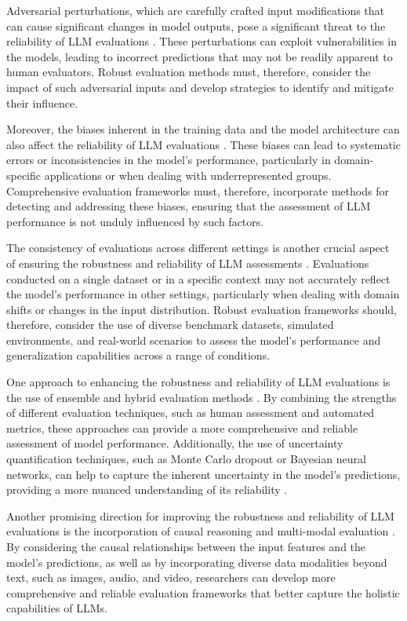 \documentclass[11pt]{article}
\begin{document}
Adversarial perturbations, which are carefully crafted input modifications that can cause significant changes in model outputs, pose a significant threat to the reliability of LLM evaluations \cite{ref135}. These perturbations can exploit vulnerabilities in the models, leading to incorrect predictions that may not be readily apparent to human evaluators. Robust evaluation methods must, therefore, consider the impact of such adversarial inputs and develop strategies to identify and mitigate their influence.

Moreover, the biases inherent in the training data and the model architecture can also affect the reliability of LLM evaluations \cite{ref136}. These biases can lead to systematic errors or inconsistencies in the model's performance, particularly in domain-specific applications or when dealing with underrepresented groups. Comprehensive evaluation frameworks must, therefore, incorporate methods for detecting and addressing these biases, ensuring that the assessment of LLM performance is not unduly influenced by such factors.

The consistency of evaluations across different settings is another crucial aspect of ensuring the robustness and reliability of LLM assessments \cite{ref137}. Evaluations conducted on a single dataset or in a specific context may not accurately reflect the model's performance in other settings, particularly when dealing with domain shifts or changes in the input distribution. Robust evaluation frameworks should, therefore, consider the use of diverse benchmark datasets, simulated environments, and real-world scenarios to assess the model's performance and generalization capabilities across a range of conditions.

One approach to enhancing the robustness and reliability of LLM evaluations is the use of ensemble and hybrid evaluation methods \cite{ref138}. By combining the strengths of different evaluation techniques, such as human assessment and automated metrics, these approaches can provide a more comprehensive and reliable assessment of model performance. Additionally, the use of uncertainty quantification techniques, such as Monte Carlo dropout or Bayesian neural networks, can help to capture the inherent uncertainty in the model's predictions, providing a more nuanced understanding of its reliability \cite{ref139}.

Another promising direction for improving the robustness and reliability of LLM evaluations is the incorporation of causal reasoning and multi-modal evaluation \cite{ref136,ref140}. By considering the causal relationships between the input features and the model's predictions, as well as by incorporating diverse data modalities beyond text, such as images, audio, and video, researchers can develop more comprehensive and reliable evaluation frameworks that better capture the holistic capabilities of LLMs.
\end{document}
